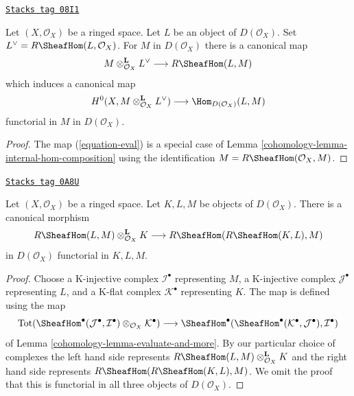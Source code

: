 \begin{lemma}[Dual]
\label{cohomology-lemma-dual}
\href{https://stacks.math.columbia.edu/tag/08I1}{\texttt{Stacks tag 08I1}}

Let $(X, \mathcal{O}_X)$ be a ringed space. Let $L$ be an
object of $D(\mathcal{O}_X)$. Set $L^\vee = R\SheafHom(L, \mathcal{O}_X)$.
For $M$ in $D(\mathcal{O}_X)$ there is a canonical map
\begin{equation}
\label{equation-eval}
M \otimes^\mathbf{L}_{\mathcal{O}_X} L^\vee
\longrightarrow
R\SheafHom(L, M)
\end{equation}
which induces a canonical map
$$
H^0(X, M \otimes^\mathbf{L}_{\mathcal{O}_X} L^\vee)
\longrightarrow
\Hom_{D(\mathcal{O}_X)}(L, M)
$$
functorial in $M$ in $D(\mathcal{O}_X)$.
\end{lemma}

\begin{proof}

The map (\ref{equation-eval}) is a special case of
Lemma \ref{cohomology-lemma-internal-hom-composition}
using the identification $M = R\SheafHom(\mathcal{O}_X, M)$.
\end{proof}

\begin{lemma}
\label{cohomology-lemma-internal-hom-evaluate}
\href{https://stacks.math.columbia.edu/tag/0A8U}{\texttt{Stacks tag 0A8U}}

Let $(X, \mathcal{O}_X)$ be a ringed space. Let $K, L, M$ be objects of
$D(\mathcal{O}_X)$. There is a canonical morphism
$$
R\SheafHom(L, M) \otimes_{\mathcal{O}_X}^\mathbf{L} K
\longrightarrow
R\SheafHom(R\SheafHom(K, L), M)
$$
in $D(\mathcal{O}_X)$ functorial in $K, L, M$.
\end{lemma}

\begin{proof}

Choose
a K-injective complex $\mathcal{I}^\bullet$ representing $M$,
a K-injective complex $\mathcal{J}^\bullet$ representing $L$, and
a K-flat complex $\mathcal{K}^\bullet$ representing $K$.
The map is defined using the map
$$
\text{Tot}(\SheafHom^\bullet(\mathcal{J}^\bullet,
\mathcal{I}^\bullet) \otimes_{\mathcal{O}_X} \mathcal{K}^\bullet)
\longrightarrow
\SheafHom^\bullet(\SheafHom^\bullet(\mathcal{K}^\bullet,
\mathcal{J}^\bullet), \mathcal{I}^\bullet)
$$
of Lemma \ref{cohomology-lemma-evaluate-and-more}. By our particular
choice of complexes the left hand side represents
$R\SheafHom(L, M) \otimes_{\mathcal{O}_X}^\mathbf{L} K$
and the right hand side represents
$R\SheafHom(R\SheafHom(K, L), M)$. We omit the proof that
this is functorial in all three objects of $D(\mathcal{O}_X)$.
\end{proof}

